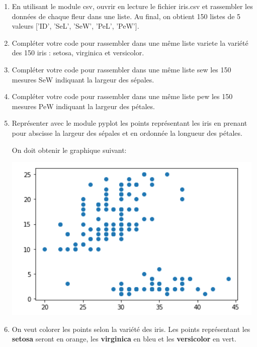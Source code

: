 \documentclass[11pt,a4paper]{article}
\begin{document}
\begin{enumerate}
\item En utilisant le module \textsf{csv}, ouvrir en lecture le fichier \textsf{iris.csv} et rassembler les données de chaque fleur dans une liste. Au final, on obtient 150 listes de 5 valeurs \textsf{['ID', 'SeL', 'SeW', 'PeL', 'PeW']}.
\item Compléter votre code pour rassembler dans une même liste \textsf{variete} la variété des 150 iris : \textsf{setosa}, \textsf{virginica} et \textsf{versicolor}.
\item Compléter votre code pour rassembler dans une même liste \textsf{sew} les 150 mesures \textsf{SeW} indiquant la largeur des sépales.
\item Compléter votre code pour rassembler dans une même liste \textsf{pew} les 150 mesures \textsf{PeW} indiquant la largeur des pétales.
\item Représenter avec le module \textsf{pyplot} les points représentant les iris en prenant pour abscisse la largeur des sépales et en ordonnée la longueur des pétales.

On doit obtenir le graphique suivant:
\begin{center}
\includegraphics[scale=0.8]{img/graphique_1.png}
\end{center}
\item On veut colorer les points selon la variété des iris. Les points représentant les \textbf{setosa} seront en orange, les \textbf{virginica} en bleu et les \textbf{versicolor} en vert.


\end{enumerate}
\end{document}
